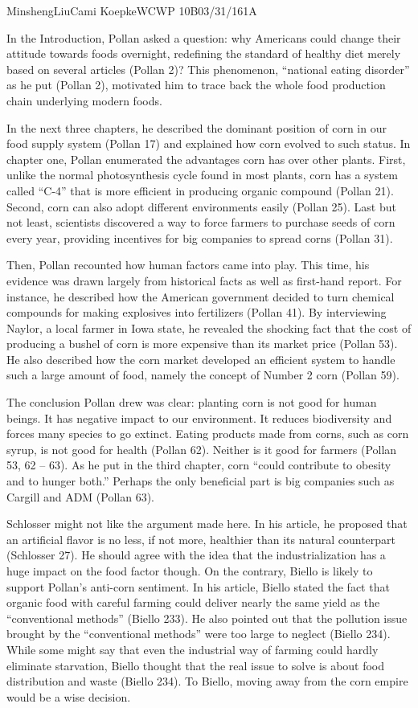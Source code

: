 \documentclass[12pt,letterpaper]{article}
\begin{document}
\begin{mla}{Minsheng}{Liu}{Cami Koepke}{WCWP 10B}{03/31/16}{1A}

In the Introduction, Pollan asked a question: why Americans could change
their attitude towards foods overnight, redefining the standard of
healthy diet merely based on several articles (Pollan 2)? This
phenomenon, ``national eating disorder'' as he put (Pollan 2), motivated
him to trace back the whole food production chain underlying modern
foods.

In the next three chapters, he described the dominant position of corn
in our food supply system (Pollan 17) and explained how corn evolved to
such status. In chapter one, Pollan enumerated the advantages corn has
over other plants. First, unlike the normal photosynthesis cycle found
in most plants, corn has a system called ``C-4'' that is more efficient
in producing organic compound (Pollan 21). Second, corn can also adopt
different environments easily (Pollan 25). Last but not least,
scientists discovered a way to force farmers to purchase seeds of corn
every year, providing incentives for big companies to spread corns
(Pollan 31).

Then, Pollan recounted how human factors came into play. This time, his
evidence was drawn largely from historical facts as well as first-hand
report. For instance, he described how the American government decided
to turn chemical compounds for making explosives into fertilizers
(Pollan 41). By interviewing Naylor, a local farmer in Iowa state, he
revealed the shocking fact that the cost of producing a bushel of corn
is more expensive than its market price (Pollan 53). He also described
how the corn market developed an efficient system to handle such a large
amount of food, namely the concept of Number 2 corn (Pollan 59).

The conclusion Pollan drew was clear: planting corn is not good for
human beings. It has negative impact to our environment. It reduces
biodiversity and forces many species to go extinct. Eating products made
from corns, such as corn syrup, is not good for health (Pollan 62).
Neither is it good for farmers (Pollan 53, 62 -- 63). As he put in the
third chapter, corn ``could contribute to obesity and to hunger both.''
Perhaps the only beneficial part is big companies such as Cargill and
ADM (Pollan 63).

Schlosser might not like the argument made here. In his article, he
proposed that an artificial flavor is no less, if not more, healthier
than its natural counterpart (Schlosser 27). He should agree with the
idea that the industrialization has a huge impact on the food factor
though. On the contrary, Biello is likely to support Pollan's anti-corn
sentiment. In his article, Biello stated the fact that organic food with
careful farming could deliver nearly the same yield as the
``conventional methods'' (Biello 233). He also pointed out that the
pollution issue brought by the ``conventional methods'' were too large
to neglect (Biello 234). While some might say that even the industrial
way of farming could hardly eliminate starvation, Biello thought that
the real issue to solve is about food distribution and waste (Biello
234). To Biello, moving away from the corn empire would be a wise
decision.


\end{mla}
\end{document}
